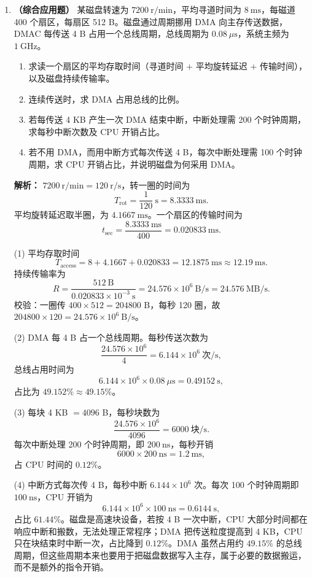 \begin{enumerate}
\item \textbf{（综合应用题）} 某磁盘转速为 $7200\ \mathrm{r/min}$，平均寻道时间为 $8\ \mathrm{ms}$，每磁道 400 个扇区，每扇区 512 B。磁盘通过周期挪用 DMA 向主存传送数据，DMAC 每传送 4 B 占用一个总线周期，总线周期为 $0.08\ \mu\mathrm{s}$，系统主频为 $1\ \mathrm{GHz}$。
\begin{enumerate}
\item[(1)] 求读一个扇区的平均存取时间（寻道时间 $+$ 平均旋转延迟 $+$ 传输时间），以及磁盘持续传输率。
\item[(2)] 连续传送时，求 DMA 占用总线的比例。
\item[(3)] 若每传送 4 KB 产生一次 DMA 结束中断，中断处理需 200 个时钟周期，求每秒中断次数及 CPU 开销占比。
\item[(4)] 若不用 DMA，而用中断方式每次传送 4 B，每次中断处理需 100 个时钟周期，求 CPU 开销占比，并说明磁盘为何采用 DMA。
\end{enumerate}

\ifshowsolutions\par\noindent\textbf{解析：} $7200\ \mathrm{r/min}=120\ \mathrm{r/s}$，转一圈的时间为
\[
T_{\text{rot}}=\frac{1}{120}\ \mathrm{s}=8.3333\ \mathrm{ms}.
\]
平均旋转延迟取半圈，为 $4.1667\ \mathrm{ms}$。一个扇区的传输时间为
\[
t_{\text{sec}}=\frac{8.3333\ \mathrm{ms}}{400}=0.020833\ \mathrm{ms}.
\]

(1) 平均存取时间
\[
T_{\text{access}}=8+4.1667+0.020833
=12.1875\ \mathrm{ms}\approx12.19\ \mathrm{ms}.
\]
持续传输率为
\[
R=\frac{512\ \mathrm{B}}{0.020833\times10^{-3}\ \mathrm{s}}
=24.576\times10^{6}\ \mathrm{B/s}=24.576\ \mathrm{MB/s}.
\]
校验：一圈传 $400\times512=204800$ B，每秒 120 圈，故 $204800\times120=24.576\times10^{6}\ \mathrm{B/s}$。

(2) DMA 每 4 B 占一个总线周期。每秒传送次数为
\[
\frac{24.576\times10^{6}}{4}=6.144\times10^{6}\ \text{次/s},
\]
总线占用时间为
\[
6.144\times10^{6}\times0.08\ \mu\mathrm{s}
=0.49152\ \mathrm{s},
\]
占比为 $49.152\%\approx49.15\%$。

(3) 每块 4 KB $=4096$ B，每秒块数为
\[
\frac{24.576\times10^{6}}{4096}=6000\ \text{块/s}.
\]
每次中断处理 200 个时钟周期，即 $200\ \mathrm{ns}$，每秒开销
\[
6000\times200\ \mathrm{ns}=1.2\ \mathrm{ms},
\]
占 CPU 时间的 $0.12\%$。

(4) 中断方式每次传 4 B，每秒中断 $6.144\times10^{6}$ 次。每次 100 个时钟周期即 $100\ \mathrm{ns}$，CPU 开销为
\[
6.144\times10^{6}\times100\ \mathrm{ns}=0.6144\ \mathrm{s},
\]
占比 $61.44\%$。磁盘是高速块设备，若按 4 B 一次中断，CPU 大部分时间都在响应中断和搬数，无法处理正常程序；DMA 把传送粒度提高到 4 KB，CPU 只在块结束时中断一次，占比降到 $0.12\%$。DMA 虽然占用约 $49.15\%$ 的总线周期，但这些周期本来也要用于把磁盘数据写入主存，属于必要的数据搬运，而不是额外的指令开销。\par\noindent{}\par\noindent
{}\par\noindent
{}\par\noindent
{}\else \answerarea[10] \fi

\end{enumerate}
